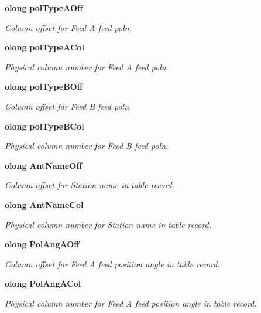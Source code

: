 \begin{CompactItemize}
{\bf olong} {\bf pol\-Type\-AOff}
\begin{CompactList}\small\item\em Column offset for Feed A feed poln. \item\end{CompactList}\item 
{\bf olong} {\bf pol\-Type\-ACol}
\begin{CompactList}\small\item\em Physical column number for Feed A feed poln. \item\end{CompactList}\item 
{\bf olong} {\bf pol\-Type\-BOff}
\begin{CompactList}\small\item\em Column offset for Feed B feed poln. \item\end{CompactList}\item 
{\bf olong} {\bf pol\-Type\-BCol}
\begin{CompactList}\small\item\em Physical column number for Feed B feed poln. \item\end{CompactList}\item 
{\bf olong} {\bf Ant\-Name\-Off}
\begin{CompactList}\small\item\em Column offset for Station name in table record. \item\end{CompactList}\item 
{\bf olong} {\bf Ant\-Name\-Col}
\begin{CompactList}\small\item\em Physical column number for Station name in table record. \item\end{CompactList}\item 
{\bf olong} {\bf Pol\-Ang\-AOff}
\begin{CompactList}\small\item\em Column offset for Feed A feed position angle in table record. \item\end{CompactList}\item 
{\bf olong} {\bf Pol\-Ang\-ACol}
\begin{CompactList}\small\item\em Physical column number for Feed A feed position angle in table record. \item\end{CompactList}\item 

\end{CompactItemize}

